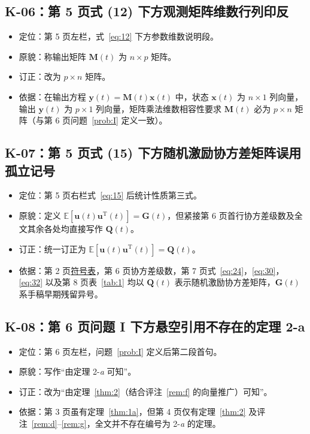 \subsection{K-06：第 5 页式 (12) 下方观测矩阵维数行列印反}\label{sec:k06}

\begin{itemize}
\item 定位：第 5 页左栏，式~\eqref{eq:12} 下方参数维数说明段。
\item 原貌：称输出矩阵 $\bm{M}(t)$ 为 $n \times p$ 矩阵。
\item 订正：改为 $p \times n$ 矩阵。
\item 依据：在输出方程 $\bm{y}(t) = \bm{M}(t)\bm{x}(t)$ 中，状态 $\bm{x}(t)$ 为 $n \times 1$ 列向量，输出 $\bm{y}(t)$ 为 $p \times 1$ 列向量，矩阵乘法维数相容性要求 $\bm{M}(t)$ 必为 $p \times n$ 矩阵（与第 6 页问题~\ref{prob:I} 定义一致）。
\end{itemize}

\subsection{K-07：第 5 页式 (15) 下方随机激励协方差矩阵误用孤立记号}\label{sec:k07}

\begin{itemize}
\item 定位：第 5 页右栏式~\eqref{eq:15} 后统计性质第三式。
\item 原貌：定义 $\mathbb{E}[\bm{u}(t)\bm{u}^{\mathrm{T}}(t)] = \bm{G}(t)$，但紧接第 6 页首行协方差级数及全文其余各处均直接写作 $\bm{Q}(t)$。
\item 订正：统一订正为 $\mathbb{E}[\bm{u}(t)\bm{u}^{\mathrm{T}}(t)] = \bm{Q}(t)$。
\item 依据：第 2 页\hyperref[sec:notation]{符号表}，第 6 页协方差级数，第 7 页式~\eqref{eq:24}，\eqref{eq:30}，\eqref{eq:32} 以及第 8 页表~\ref{tab:1} 均以 $\bm{Q}(t)$ 表示随机激励协方差矩阵，$\bm{G}(t)$ 系手稿早期残留异号。
\end{itemize}

\subsection{K-08：第 6 页问题 I 下方悬空引用不存在的定理 2-a}\label{sec:k08}

\begin{itemize}
\item 定位：第 6 页左栏，问题~\ref{prob:I} 定义后第二段首句。
\item 原貌：写作“由定理 2-\emph{a} 可知”。
\item 订正：改为“由定理~\ref{thm:2}（结合评注~\ref{rem:f} 的向量推广）可知”。
\item 依据：第 3 页虽有定理~\ref{thm:1a}，但第 4 页仅有定理~\ref{thm:2} 及评注~\ref{rem:d}–\ref{rem:g}，全文并不存在编号为 2-\emph{a} 的定理。
\end{itemize}

